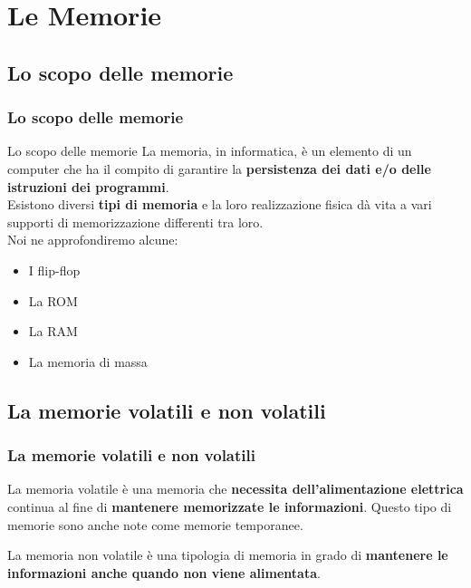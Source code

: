 \section[Le Memorie]{Le Memorie}
\label{sec:memory}


\subsection[Lo scopo delle memorie]{Lo scopo delle memorie}
\begin{frame}
	\frametitle{Lo scopo delle memorie}
	
	\begin{block}{Lo scopo delle memorie}
		La memoria, in informatica, è un elemento di un computer che ha il compito di garantire la \textbf{persistenza dei dati e/o delle istruzioni dei programmi}.\\\vspace{0.5em}
		Esistono diversi \textbf{tipi di memoria} e la loro realizzazione fisica dà vita a vari supporti di memorizzazione differenti tra loro.\\\vspace{0.5em}
		Noi ne approfondiremo alcune:
		
		\begin{itemize}
			\item I flip-flop
			\item La ROM
			\item La RAM
			\item La memoria di massa
		\end{itemize}
		
	\end{block}
	
\end{frame}


\subsection[La memorie volatili e non volatili]{La memorie volatili e non volatili}
\begin{frame}
	\frametitle{La memorie volatili e non volatili}
	 
	\begin{block}{La memoria volatile}
		è una memoria che \textbf{necessita dell'alimentazione elettrica} continua al fine di \textbf{mantenere memorizzate le informazioni}. Questo tipo di memorie sono anche note come memorie temporanee.
	\end{block}
	\vspace{1.0em}
	\begin{block}{La memoria non volatile}
		è una tipologia di memoria in grado di \textbf{mantenere le informazioni anche quando non viene alimentata}.
	\end{block}
	
\end{frame}


